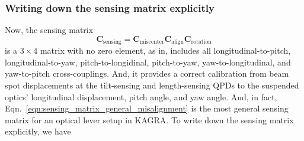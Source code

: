 \subsubsection{Writing down the sensing matrix explicitly \label{sec:sensing_matrix_misalign}}
Now, the sensing matrix
\begin{equation}
	\mathbf{C}_\mathrm{sensing}=\mathbf{C}_\mathrm{miscenter}\mathbf{C}_\mathrm{align}\mathbf{C}_\mathrm{rotation}
\end{equation}
is a $3\times 4$ matrix with no zero element, as in, includes all longitudinal-to-pitch, longitudinal-to-yaw, pitch-to-longidinal, pitch-to-yaw, yaw-to-longitudinal, and yaw-to-pitch cross-couplings.
And, it provides a correct calibration from beam spot displacements at the tilt-sensing and length-sensing QPDs to the suspended optics' longitudinal displacement, pitch angle, and yaw angle.
And, in fact, Eqn.~\eqref{eqn:sensing_matrix_general_misalignment} is the most general sensing matrix for an optical lever setup in KAGRA.
To write down the sensing matrix explicitly, we have
